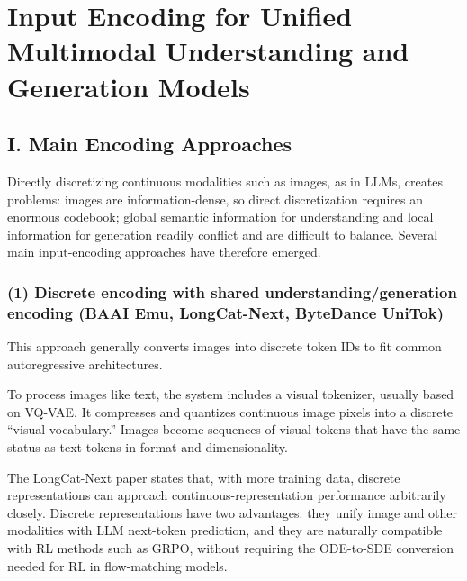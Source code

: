 \setcounter{section}{0}

\hypertarget{input-encoding-for-unified-multimodal-understanding-and-generation-models}{%
\section{Input Encoding for Unified Multimodal Understanding and Generation Models}\label{input-encoding-for-unified-multimodal-understanding-and-generation-models}}

\hypertarget{i.-main-encoding-approaches}{%
\subsection{I. Main Encoding Approaches}\label{i.-main-encoding-approaches}}

Directly discretizing continuous modalities such as images, as in LLMs, creates problems: images are information-dense, so direct discretization requires an enormous codebook; global semantic information for understanding and local information for generation readily conflict and are difficult to balance. Several main input-encoding approaches have therefore emerged.

\hypertarget{discrete-encoding-with-shared-understandinggeneration-encoding-baai-emu-longcat-next-bytedance-unitok}{%
\subsubsection{(1) Discrete encoding with shared understanding/generation encoding (BAAI Emu, LongCat-Next, ByteDance UniTok)}\label{discrete-encoding-with-shared-understandinggeneration-encoding-baai-emu-longcat-next-bytedance-unitok}}

This approach generally converts images into discrete token IDs to fit common autoregressive architectures.

To process images like text, the system includes a visual tokenizer, usually based on VQ-VAE. It compresses and quantizes continuous image pixels into a discrete ``visual vocabulary.'' Images become sequences of visual tokens that have the same status as text tokens in format and dimensionality.

The LongCat-Next paper states that, with more training data, discrete representations can approach continuous-representation performance arbitrarily closely. Discrete representations have two advantages: they unify image and other modalities with LLM next-token prediction, and they are naturally compatible with RL methods such as GRPO, without requiring the ODE-to-SDE conversion needed for RL in flow-matching models.

